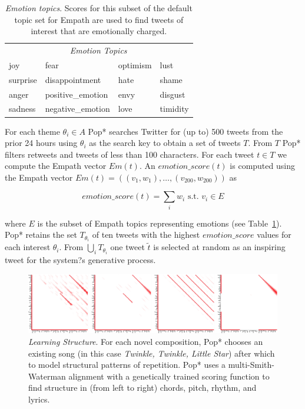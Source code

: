 \documentclass[phd,electronic,oneside,twosidetoc,letterpaper,chaptercenter,parttop,lol,lof,lot]{byumsphd}
\begin{document}
\begin{table}
\centering
\begin{tabular}{llll}
         & \multicolumn{2}{c}{\textit{Emotion Topics}} &                \\
joy      & fear                      & optimism        & lust           \\
surprise & disappointment             & hate            & shame          \\
anger    & positive\_emotion         & envy            &  disgust\\
sadness  & negative\_emotion         & love            & timidity      
\end{tabular}
\caption{\textit{Emotion topics}. Scores for this subset of the default topic set for Empath \citep{Fast2016} are used to find tweets of interest that are emotionally charged.}
\label{tab:empath_emotions}
\end{table}

For each theme $\theta_i \in A$ Pop* searches Twitter for (up to) 500 tweets from the prior 24 hours using $\theta_i$ as the search key to obtain a set of tweets $T$. From $T$ Pop* filters retweets and tweets of less than 100 characters. For each tweet $t\in T$ we compute the Empath vector $Em(t)$. An $emotion\_score(t)$ is computed using the Empath vector $Em(t)=((v_1,w_1),\dots,(v_200,w_200))$ as

\[
emotion\_score(t) = \sum_i w_i \text{ s.t. } v_i\in E
\]

\noindent where $E$ is the subset of Empath topics representing emotions (see Table~\ref{tab:empath_emotions}). Pop* retains the set $T_{\theta_i}$ of ten tweets with the highest $emotion\_score$ values for each interest $\theta_i$. From $\bigcup_i T_{\theta_i}$ one tweet $\tilde{t}$ is selected at random as an inspiring tweet for the system?s generative process.

\begin{figure}
    \centering
    \includegraphics[width=\linewidth]{structure}
    \caption{\textit{Learning Structure}. For each novel composition, Pop* chooses an existing song (in this case \textit{Twinkle, Twinkle, Little Star}) after which to model structural patterns of repetition. Pop* uses a multi-Smith-Waterman alignment with a genetically trained scoring function to find structure in (from left to right) chords, pitch, rhythm, and lyrics.}
    \label{fig:structure}
\end{figure}
\end{document}
